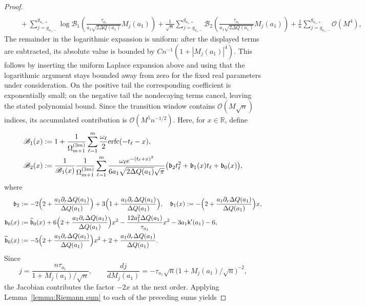 \documentclass[a4paper]{article}
\newcommand{\erfc}{{\rm erfc}}
\numberwithin{equation}{section}
\begin{document}
\begin{proof}
\begin{align*}
\\
&\quad
+
\sum_{j=g_{a_1,-}}^{g_{a_1,+}}\log\mathscr{B}_1(\tfrac{\tau_{a_1}}{a_1\sqrt{2\Delta Q(a_1)}}M_j(a_1))
+\frac{1}{\sqrt{n}}\sum_{j=g_{a_1,-}}^{g_{a_1,+}}
\mathscr{B}_{2}(\tfrac{\tau_{a_1}}{a_1\sqrt{2\Delta Q(a_1)}}M_j(a_1))
+
\frac{1}{n}\sum_{j=g_{a_1,-}}^{g_{a_1,+}}
\mathcal{O}(M^4),
\end{align*}
The remainder in the logarithmic expansion is uniform: after the displayed
terms are subtracted, its absolute value is bounded by
$Cn^{-1}(1+|M_j(a_1)|^4)$.  This follows by inserting the uniform Laplace
expansion above and using that the logarithmic argument stays bounded away
from zero for the fixed real parameters under consideration.  On the
positive tail the corresponding coefficient is exponentially small; on the
negative tail the nondecaying terms cancel, leaving the stated polynomial
bound.  Since the transition window contains $\mathcal{O}(M\sqrt n)$
indices, its accumulated contribution is $\mathcal{O}(M^5n^{-1/2})$.
Here, for $x\in\mathbb R$, define
\begin{align*}
\mathscr{B}_1(x)&:= 1+\frac{1}{\Omega_{m+1}^{(3m)}}\sum_{\ell=1}^{m}
\frac{\omega_{\ell}}{2}\erfc(-t_{\ell}-x), 
\\
\mathscr{B}_{2}(x)
&:=
\frac{1}{\mathscr{B}_1(x)}
\frac{1}{\Omega_{m+1}^{(3m)}}
\sum_{\ell=1}^{m}
\frac{\omega_{\ell}e^{-(t_{\ell}+x)^2}}{6a_1\sqrt{2\Delta Q(a_1)}\sqrt{\pi}}
\bigl( 
\mathfrak{b}_2t_{\ell}^2+\mathfrak{b}_1(x)t_{\ell}+\mathfrak{b}_0(x)
\bigr), 
\end{align*}
where 
\begin{align*}
\mathfrak{b}_2&:=
-2\Bigl(2+\frac{a_1\partial_r\Delta Q(a_1)}{\Delta Q(a_1)}\Bigr)
+
3\Bigl(1+\frac{a_1\partial_r\Delta Q(a_1)}{\Delta Q(a_1)}\Bigr), 
\quad
\mathfrak{b}_1(x):=-\Bigl(2+\frac{a_1\partial_r\Delta Q(a_1)}{\Delta Q(a_1)}\Bigr)x, 
\\
\mathfrak{b}_0(x)&:=
\widetilde{\mathfrak{b}}_0(x)
+
6\Bigl(
2+\frac{a_1\partial_r\Delta Q(a_1)}{\Delta Q(a_1)}
\Bigr)x^2
-\frac{12a_1^2\Delta Q(a_1)}{\tau_{a_1}}x^2
-3a_1\mathsf{k}'(a_1)-6, 
\\
\widetilde{\mathfrak{b}}_0(x)
&:=
-5\Bigl(
2+\frac{a_1\partial_r\Delta Q(a_1)}{\Delta Q(a_1)}
\Bigr)x^2
+2+\frac{a_1\partial_r\Delta Q(a_1)}{\Delta Q(a_1)}. 
\end{align*}
Since
\[
j=\frac{n\tau_{a_1}}{1+M_j(a_1)/\sqrt n},
\qquad
\frac{dj}{dM_j(a_1)}
=-\tau_{a_1}\sqrt n\bigl(1+M_j(a_1)/\sqrt n\bigr)^{-2},
\]
the Jacobian contributes the factor $-2x$ at the next order.  Applying
Lemma~\ref{lemma:Riemann sum} to each of the preceding sums yields

\end{proof}
\end{document}
